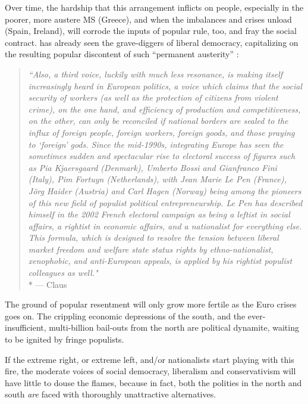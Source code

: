 Over time, the hardship that this arrangement inflicts on people, especially in the poorer, more austere \gls{MS} (Greece), and when the imbalances and crises unload (Spain, Ireland), will corrode the inputs of popular rule, too, and fray the social contract.
\citeauthor{Offe2003} has already seen the grave-diggers of liberal democracy, capitalizing on the resulting popular discontent of such ``permanent austerity'' \citep{Streeck2010c}:
\begin{quotation}
	\emph{``Also, a third voice, luckily with much less resonance, is making itself increasingly heard in European politics, a voice which claims that the social security of workers (as well as the protection of citizens from violent crime), on the one hand, and efficiency of production and competitiveness, on the other, can only be reconciled if national borders are sealed to the influx of foreign people, foreign workers, foreign goods, and those praying to `foreign' gods.
	Since the mid-1990s, integrating Europe has seen the sometimes sudden and spectacular rise to electoral success of figures such as Pia Kjaersgaard (Denmark), Umberto Bossi and Gianfranco Fini (Italy), Pim Fortuyn (Netherlands), with Jean Marie Le Pen (France), Jörg Haider (Austria) and Carl Hagen (Norway) being among the pioneers of this new field of populist political entrepreneurship.
	Le Pen has described himself in the 2002 French electoral campaign as being a leftist in social affairs, a rightist in economic affairs, and a nationalist for everything else.
	\\
	This formula, which is designed to resolve the tension between liberal market freedom and welfare state status rights by ethno-nationalist, xenophobic, and anti-European appeals, is applied by his rightist populist colleagues as well."}
	\\*
	--- Claus \citet[454]{Offe2003}
\end{quotation}

The ground of popular resentment will only grow more fertile as the Euro crises goes on.
The crippling economic depressions of the south, and the ever-insufficient, multi-billion bail-outs from the north are political dynamite, waiting to be ignited by fringe populists.

If the extreme right, or extreme left, and/or nationalists start playing with this fire, the moderate voices of social democracy, liberalism and conservativism will have little to douse the flames, because in fact, both the polities in the north and south \emph{are} faced with thoroughly unattractive alternatives.

